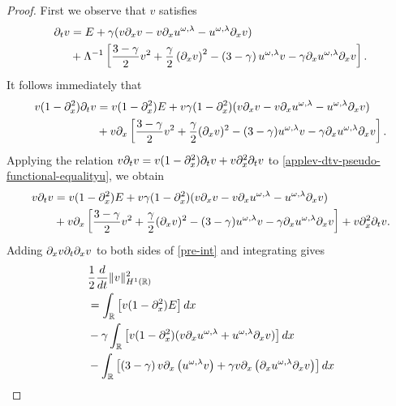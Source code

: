 \begin{proof} First we observe that $v$ satisfies 
%
%
\begin{equation*}
\begin{split}
\partial_t v & = E + \gamma(v \partial_x v - v \partial_x u^{\omega,\lambda} - 
u^{\omega,\lambda} \partial_x v) \\
& + \Lambda^{-1}  \left[ \frac{3-
\gamma}{2}v^2 + \frac{\gamma}{2}\left( \partial_x v \right)^2 - \left(
3 - \gamma \right)u^{\omega,\lambda} v -
\gamma \partial_x u^{\omega,\lambda} \partial_x v \right].
\end{split}
\end{equation*}
It follows immediately that
\begin{equation}
\label{applev-dtv-pseudo-functional-equalityu}
\begin{split}
v(1-\partial_x^2)\partial_t v &= v(1- \partial_x^2)E + v\gamma(1- \partial_x^2)(v\partial_x v 
- v\partial_x u^{\omega,\lambda} -
u^{\omega,\lambda} \partial_x v)
\\
&+ v\partial_x \left[ \frac{3-\gamma}{2}v^2 + \frac{\gamma}{2}(\partial_x v)^2 -
(3-\gamma)u^{\omega,\lambda} v - \gamma \partial_x u^{\omega,\lambda} \partial_x v \right].
\end{split}
\end{equation}
Applying the relation $v\partial_t v = v(1-\partial_x^2) \partial_t v + v\partial_x^2 \partial_t v$ to
\eqref{applev-dtv-pseudo-functional-equalityu}, we obtain
\begin{equation}
\label{pre-int}
\begin{split}
v \partial_t v &= v(1- \partial_x^2)E + v\gamma(1- \partial_x^2)(v\partial_x v - v\partial_x u^{\omega,\lambda} -
u^{\omega,\lambda} \partial_x v)
\\
&+ v\partial_x \left[ \frac{3-\gamma}{2}v^2 + \frac{\gamma}{2}(\partial_x v)^2 -
(3-\gamma)u^{\omega,\lambda} v - \gamma \partial_x u^{\omega,\lambda} \partial_x v
\right] + v\partial_x^2 \partial_t v.
\end{split}
\end{equation}
Adding $\partial_x v \partial_t \partial_x v$ to both sides of \eqref{pre-int} and 
integrating gives
\begin{equation}
\label{appleenergy-estu}
\begin{split}
&\frac{1}{2} \frac{d}{dt} \|v\|_{H^1(\rr)}^2  
\\
& =  \int_{\rr} \left[ v(1-\p_x^2)E \right]dx
\\
& - \gamma \int_{\rr} \left[ v(1-\p_x^2)(v\p_x u^{\omega,\lambda} + u^{\omega,\lambda} \p_x v) \right]dx
\\
&- \int_{\rr}\left[ \left( 3-\gamma \right)v \p_x\left( u^{\omega,\lambda}v \right) + \gamma v
\p_x \left( \p_x u^{\omega,\lambda} \p_x v \right)\right]dx

\end{split}
\end{equation}
\end{proof}
